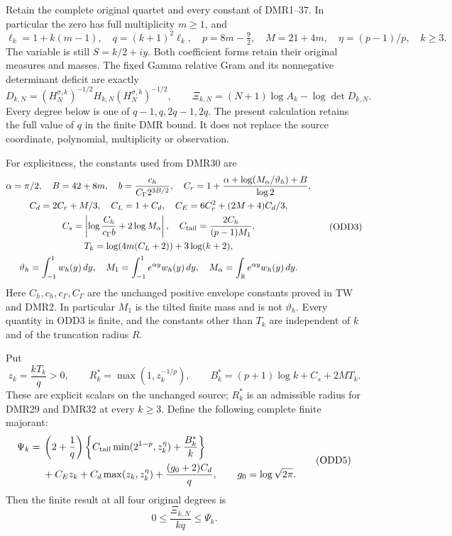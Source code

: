 \documentclass[11pt,a4paper]{article}
\begin{document}
Retain the complete original quartet and every constant of DMR1--37.
In particular the zero has full multiplicity $m\geq1$, and
\[
 \ell_k=1+k(m-1),\quad q=(k+1)^2\ell_k,\quad
 p=8m-\tfrac92,\quad M=21+4m,\quad
 \eta=(p-1)/p,\quad k\geq3.
 \tag{ODD1}
\]
The variable is still $S=k/2+iy$. Both coefficient forms retain
their original measures and masses. The fixed Gamma relative Gram
and its nonnegative determinant deficit are exactly
\[
 D_{k,N}=(H^{\sigma,k}_N)^{-1/2}H_{k,N}(H^{\sigma,k}_N)^{-1/2},
 \qquad \Xi_{k,N}=(N+1)\log A_k-\log\det D_{k,N}.
 \tag{ODD2}
\]
Every degree below is one of $q-1,q,2q-1,2q$. The present
calculation retains the full value of $q$ in the finite DMR bound.
It does not replace the source coordinate, polynomial, multiplicity
or observation.

For explicitness, the constants used from DMR30 are
\[
\begin{gathered}
 \alpha=\pi/2,\quad B=42+8m,\quad
 b=\frac{c_h}{C_\Gamma 2^{3B/2}},\quad
 C_r=1+\frac{\alpha+\log(M_\alpha/\vartheta_h)+B}{\log2},\\
 C_d=2C_r+M/3,\quad C_L=1+C_d,\quad
 C_E=6C_r^2+(2M+4)C_d/3,\\
 C_s=\left|\log\frac{C_h}{c_\Gamma b}+2\log M_\alpha\right|,
 \quad C_{\rm tail}=\frac{2C_h}{(p-1)M_1},\\
 T_k=\log(4m(C_L+2))+3\log(k+2),\\
 \vartheta_h=\int_{-1}^1w_h(y)\,dy,\quad
 M_1=\int_{-1}^1e^{\alpha y}w_h(y)\,dy,\quad
 M_\alpha=\int_{\mathbb R}e^{\alpha y}w_h(y)\,dy .
\end{gathered}\tag{ODD3}
\]
Here $C_h,c_h,c_\Gamma,C_\Gamma$ are the unchanged positive
envelope constants proved in TW and DMR2. In particular $M_1$
is the tilted finite mass and is not $\vartheta_h$. Every
quantity in ODD3 is finite, and the constants other than $T_k$
are independent of $k$ and of the truncation radius $R$.

Put
\[
 z_k=\frac{kT_k}{q}>0,\qquad
 R_k^*=\max(1,z_k^{-1/p}),\qquad
 B_k^*=(p+1)\log k+C_s+2MT_k.
 \tag{ODD4}
\]
These are explicit scalars on the unchanged source; $R_k^*$ is
an admissible radius for DMR29 and DMR32 at every $k\geq3$.
Define the following complete finite majorant:
\[
\begin{split}
 \Psi_k={}&\left(2+\frac1q\right)
 \left\{C_{\rm tail}\min(2^{1-p},z_k^\eta)
                       +\frac{B_k^*}{k}\right\}\\
 &+C_Ez_k+C_d\max(z_k,z_k^\eta)
                       +\frac{(g_0+2)C_d}{q},
 \qquad g_0=\log\sqrt{2\pi}.
\end{split}\tag{ODD5}
\]
Then the finite result at all four original degrees is
\[
 \boxed{\quad 0\leq\frac{\Xi_{k,N}}{kq}\leq\Psi_k.\quad}
 \tag{ODD6}
\]
\end{document}
